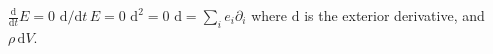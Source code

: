 \documentclass{article}
\begin{document}
$\frac{\mathrm d}{\mathrm dt}E=0$ $\mathrm d/\mathrm dt\,E=0$ $\mathrm d^2=0$ $\mathrm d=\sum_i e_i\partial_i$
where $\mathrm d$ is the exterior derivative, and $\rho\,\mathrm dV$.
\end{document}
